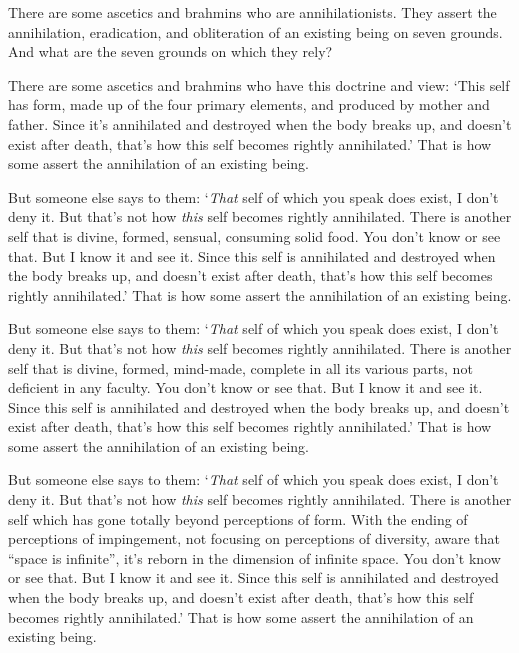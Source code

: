 \documentclass[12pt,openany]{book}%
\begin{document}
There are some ascetics and brahmins who are annihilationists. They assert the annihilation, eradication, and obliteration of an existing being on seven grounds. And what are the seven grounds on which they rely? 

There are some ascetics and brahmins who have this doctrine and view: ‘This self has form, made up of the four primary elements, and produced by mother and father. Since it’s annihilated and destroyed when the body breaks up, and doesn’t exist after death, that’s how this self becomes rightly annihilated.’ That is how some assert the annihilation of an existing being. 

But someone else says to them: ‘\emph{That} self of which you speak does exist, I don’t deny it. But that’s not how \emph{this} self becomes rightly annihilated. There is another self that is divine, formed, sensual, consuming solid food. You don’t know or see that. But I know it and see it. Since this self is annihilated and destroyed when the body breaks up, and doesn’t exist after death, that’s how this self becomes rightly annihilated.’ That is how some assert the annihilation of an existing being. 

But someone else says to them: ‘\emph{That} self of which you speak does exist, I don’t deny it. But that’s not how \emph{this} self becomes rightly annihilated. There is another self that is divine, formed, mind-made, complete in all its various parts, not deficient in any faculty. You don’t know or see that. But I know it and see it. Since this self is annihilated and destroyed when the body breaks up, and doesn’t exist after death, that’s how this self becomes rightly annihilated.’ That is how some assert the annihilation of an existing being. 

But someone else says to them: ‘\emph{That} self of which you speak does exist, I don’t deny it. But that’s not how \emph{this} self becomes rightly annihilated. There is another self which has gone totally beyond perceptions of form. With the ending of perceptions of impingement, not focusing on perceptions of diversity, aware that “space is infinite”, it’s reborn in the dimension of infinite space. You don’t know or see that. But I know it and see it. Since this self is annihilated and destroyed when the body breaks up, and doesn’t exist after death, that’s how this self becomes rightly annihilated.’ That is how some assert the annihilation of an existing being. 
\end{document}
